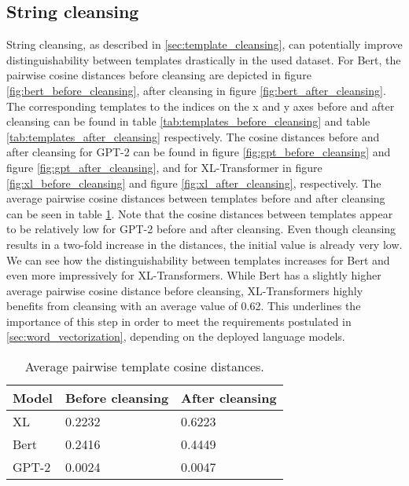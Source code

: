 \subsection{String cleansing}
String cleansing, as described in \ref{sec:template_cleansing}, can potentially  improve distinguishability between templates drastically in the used dataset.
For Bert, the pairwise cosine distances before cleansing are depicted in figure \ref{fig:bert_before_cleansing}, after cleansing in figure \ref{fig:bert_after_cleansing}. The corresponding templates to the indices on the x and y axes before and after cleansing can be found in table \ref{tab:templates_before_cleansing} and table \ref{tab:templates_after_cleansing} respectively.
The cosine distances before and after cleansing for GPT-2 can be found in figure \ref{fig:gpt_before_cleansing} and figure \ref{fig:gpt_after_cleansing}, and for XL-Transformer in figure \ref{fig:xl_before_cleansing} and figure \ref{fig:xl_after_cleansing}, respectively. The average pairwise cosine distances between templates before and after cleansing can be seen in table \ref{tab:average_pairwise_cos_distances}.
Note that the cosine distances between templates appear to be relatively low for GPT-2 before and after cleansing. Even though cleansing results in a two-fold increase in the distances, the initial value is already very low. We can see how the distinguishability between templates increases for Bert and even more impressively for XL-Transformers. While Bert has a slightly higher average pairwise cosine distance before cleansing, XL-Transformers highly benefits from cleansing with an average value of 0.62. This underlines the importance of this step in order to meet the requirements postulated in \ref{sec:word_vectorization}, depending on the deployed language models.



\begin{table}[ht]
\centering
\begin{small}
\begin{tabular}{ p{1.3cm} p{2.5cm} p{2.5cm} }
\toprule
Model & Before cleansing & After cleansing\\
\midrule
XL & 0.2232 & 0.6223\\
Bert & 0.2416 & 0.4449\\
GPT-2 & 0.0024 & 0.0047 \\ 

\bottomrule
\end{tabular}
\caption{Average pairwise template cosine distances.}
\label{tab:average_pairwise_cos_distances}
\end{small}
\end{table}


